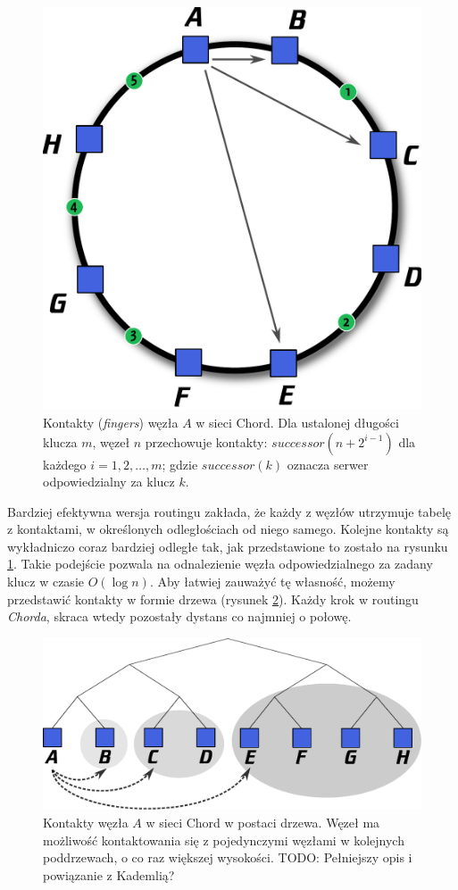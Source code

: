 \documentclass[a4paper,11pt]{scrartcl}
\begin{document}
\begin{figure}[h]
\centering
\includegraphics[width=0.5\linewidth]{img/chord.pdf}
\caption{Kontakty (\textit{fingers}) węzła $A$ w sieci Chord. Dla ustalonej długości klucza $m$, węzeł $n$ przechowuje kontakty: $successor(n + 2^{i-1})$ dla każdego $i = 1, 2, \dots,  m$; gdzie $successor(k)$ oznacza serwer odpowiedzialny za klucz $k$.}
\label{fig_chord_fingers_1}
\end{figure}

Bardziej efektywna wersja routingu zakłada, że każdy z węzłów utrzymuje tabelę z kontaktami, w określonych odległościach od niego samego. Kolejne kontakty są wykładniczo coraz bardziej odległe tak, jak przedstawione to zostało na rysunku \ref{fig_chord_fingers_1}. Takie podejście pozwala na odnalezienie węzła odpowiedzialnego za zadany klucz w czasie $O (\log n)$. Aby łatwiej zauważyć tę własność, możemy przedstawić kontakty w formie drzewa (rysunek \ref{fig_chord_fingers_2}). Każdy krok w routingu \textit{Chorda}, skraca wtedy pozostały dystans co najmniej o połowę.


\begin{figure}[h]
\centering
\includegraphics[width=0.9\linewidth]{img/chord_2.pdf}
\caption{Kontakty węzła $A$ w sieci Chord w postaci drzewa. Węzeł ma możliwość kontaktowania się z pojedynczymi węzłami w kolejnych poddrzewach, o co raz większej wysokości.  
TODO: Pełniejszy opis i powiązanie z Kademlią?}
\label{fig_chord_fingers_2}
\end{figure}
\end{document}
